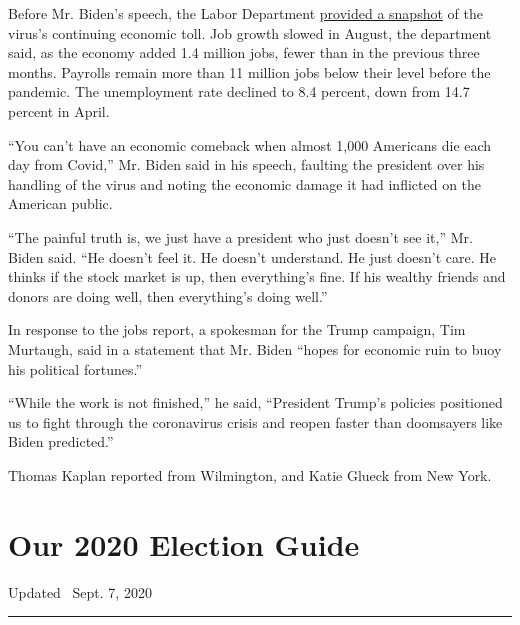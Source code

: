 Before Mr. Biden's speech, the Labor Department
\href{https://www.nytimes3xbfgragh.onion/2020/09/04/business/economy/jobs-report.html}{provided
a snapshot} of the virus's continuing economic toll. Job growth slowed
in August, the department said, as the economy added 1.4 million jobs,
fewer than in the previous three months. Payrolls remain more than 11
million jobs below their level before the pandemic. The unemployment
rate declined to 8.4 percent, down from 14.7 percent in April.

``You can't have an economic comeback when almost 1,000 Americans die
each day from Covid,'' Mr. Biden said in his speech, faulting the
president over his handling of the virus and noting the economic damage
it had inflicted on the American public.

``The painful truth is, we just have a president who just doesn't see
it,'' Mr. Biden said. ``He doesn't feel it. He doesn't understand. He
just doesn't care. He thinks if the stock market is up, then
everything's fine. If his wealthy friends and donors are doing well,
then everything's doing well.''

In response to the jobs report, a spokesman for the Trump campaign, Tim
Murtaugh, said in a statement that Mr. Biden ``hopes for economic ruin
to buoy his political fortunes.''

``While the work is not finished,'' he said, ``President Trump's
policies positioned us to fight through the coronavirus crisis and
reopen faster than doomsayers like Biden predicted.''

Thomas Kaplan reported from Wilmington, and Katie Glueck from New York.

\hypertarget{our-2020-election-guide}{%
\section{Our 2020 Election Guide}\label{our-2020-election-guide}}

Updated ~Sept. 7, 2020

\begin{center}\rule{0.5\linewidth}{\linethickness}\end{center}

